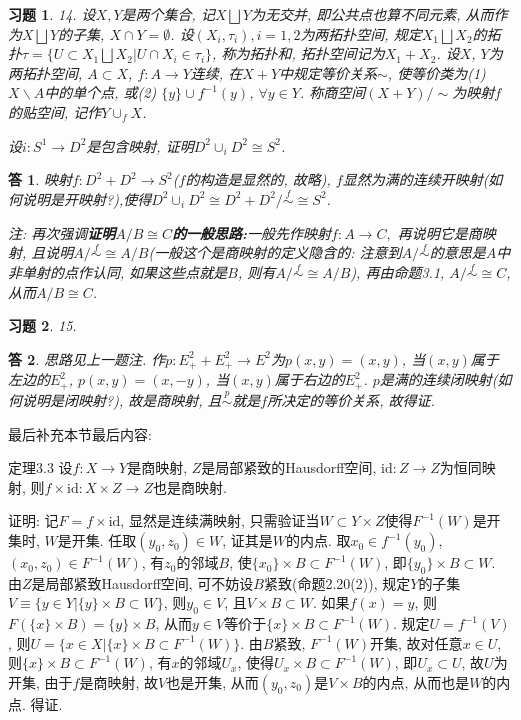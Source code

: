 \documentclass{ctexart}%
\newtheorem*{exercise}{习题}
\newtheorem*{solution}{答}
\theoremstyle{definition}
\theoremstyle{remark}
\begin{document}
 \begin{exercise}14. 设$X, Y$是两个集合, 记$X\bigsqcup Y$为无交并, 即公共点也算不同元素, 从而作为$X\bigsqcup Y$的子集, $X\cap Y=\emptyset$. 设$(X_i, \tau_i),i=1,2$为两拓扑空间, 规定$X_1\bigsqcup X_2$的拓扑$\tau=\{U\subset X_1 \bigsqcup X_2|U\cap X_i \in \tau_i\}$, 称为拓扑和, 拓扑空间记为$X_1+X_2$. 设$X$, $Y$为两拓扑空间, $A\subset X$, $f: A\rightarrow Y$连续, 在$X+Y$中规定等价关系$\sim$, 使等价类为(1) $X\backslash A$中的单个点, 或(2) $\{y\}\cup f^{-1}(y)$, $\forall y\in Y$. 称商空间$(X+Y)\slash \sim$为映射$f$的贴空间, 记作$Y\cup_f X$.  
 
 设$i: S^1\rightarrow D^2$是包含映射, 证明$D^2\cup_i D^2\cong S^2$. 
 \end{exercise}
 \begin{solution}映射$f: D^2+D^2\rightarrow S^2$($f$的构造是显然的, 故略), $f$显然为满的连续开映射(如何说明是开映射?),使得$D^2\cup_i D^2
 \cong D^2+D^2/\overset{f}{\sim} \cong S^2$.
 
注: 再次强调\textbf{证明$A\slash B\cong C$的一般思路:}一般先作映射$f: A\rightarrow C, $ 再说明它是商映射, 且说明$A\slash \overset{f}{\sim} \cong A\slash B$(一般这个是商映射的定义隐含的: 注意到$A/\overset{f}{\sim}$的意思是$A$中非单射的点作认同, 如果这些点就是$B$, 则有$A\slash \overset{f}{\sim} \cong A\slash B$), 再由命题3.1, $A\slash \overset{f}{\sim}\cong C$, 从而$A\slash B\cong C$.
 \end{solution}

\begin{exercise}15. 
\end{exercise}
\begin{solution}
思路见上一题注. 作$p: E^2_++E^2_+\rightarrow E^2$为$p(x,y)=(x,y)$, 当$(x,y)$属于左边的$E^2_+$, $p(x,y)=(x,-y)$, 当$(x,y)$属于右边的$E^2_+$. $p$是满的连续闭映射(如何说明是闭映射?), 故是商映射, 且$\overset{p}{\sim}$就是$f$所决定的等价关系, 故得证. 
\end{solution}

最后补充本节最后内容: 

定理3.3 设$f: X\rightarrow Y$是商映射, $Z$是局部紧致的Hausdorff空间, $\text{id}: Z\rightarrow Z$为恒同映射, 则$f\times \text{id}: X\times Z\rightarrow Z$也是商映射. 

证明: 记$F=f\times \text{id}$, 显然是连续满映射, 只需验证当$W\subset Y\times Z$使得$F^{-1}(W)$是开集时, $W$是开集. 任取$(y_0,z_0)\in W$, 证其是$W$的内点. 取$x_0\in f^{-1}(y_0)$, $(x_0,z_0)\in F^{-1}(W)$, 有$z_0$的邻域$B$, 使$\{x_0\}\times B\subset F^{-1}(W)$, 即$\{y_0\}\times B\subset W$. 由$Z$是局部紧致Hausdorff空间, 可不妨设$B$紧致(命题2.20(2)), 规定$Y$的子集$V \equiv \{y\in Y|\{y\}\times B\subset W\}$, 则$y_0\in V$, 且$V\times B\subset W$. 如果$f(x)=y$, 则$F(\{x\}\times B)=\{y\}\times B$, 从而$y\in V$等价于$\{x\}\times B\subset F^{-1}(W)$. 规定$U=f^{-1}(V)$, 则$U=\{x\in X|\{x\}\times B\subset F^{-1}(W)\}$. 由$B$紧致, $F^{-1}(W)$开集, 故对任意$x\in U$, 则$\{x\}\times B\subset F^{-1}(W)$, 有$x$的邻域$U_x$, 使得$U_x\times B\subset F^{-1}(W)$, 即$U_x\subset U$, 故$U$为开集, 由于$f$是商映射, 故$V$也是开集, 从而$(y_0,z_0)$是$V\times B$的内点, 从而也是$W$的内点. 得证. 
\end{document}
